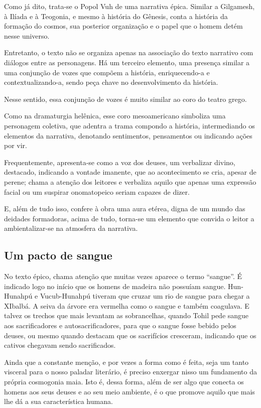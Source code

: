 \documentclass[12pt]{extarticle}
\begin{document}
Como já dito, trata-se o Popol Vuh de uma narrativa épica. Similar a
Gilgamesh, à Ilíada e à Teogonia, e mesmo à história do Gênesis, conta a
história da formação do cosmos, sua posterior organização e o papel que
o homem detém nesse universo.

Entretanto, o texto não se organiza apenas na associação do texto
narrativo com diálogos entre as personagens. Há um terceiro elemento,
uma presença similar a uma conjunção de vozes que compõem a história,
enriquecendo-a e contextualizando-a, sendo peça chave no desenvolvimento
da história.

Nesse sentido, essa conjunção de vozes é muito similar ao coro do teatro
grego.

Como na dramaturgia helênica, esse coro mesoamericano simboliza uma
personagem coletiva, que adentra a trama compondo a história,
intermediando os elementos da narrativa, denotando sentimentos,
pensamentos ou indicando ações por vir.

Frequentemente, apresenta-se como a voz dos deuses, um verbalizar
divino, destacado, indicando a vontade imanente, que ao acontecimento se
cria, apesar de perene; chama a atenção dos leitores e verbaliza aquilo
que apenas uma expressão facial ou um suspirar onomatopeico seriam
capazes de dizer.

E, além de tudo isso, confere à obra uma aura etérea, digna de um mundo
das deidades formadoras, acima de tudo, torna-se um elemento que convida
o leitor a ambientalizar-se na atmosfera da narrativa.

\subsection{Um pacto de sangue}

No texto épico, chama atenção que muitas vezes aparece o termo
``sangue''. É indicado logo no início que os homens de madeira não
possuíam sangue. Hun-Hunahpú e Vucub-Hunahpú tiveram que cruzar um rio
de sangue para chegar a XIbalbá. A seiva da árvore era vermelha como o
sangue e também coagulava. E talvez os trechos que mais levantam as
sobrancelhas, quando Tohil pede sangue aos sacrificadores e
autosacrificadores, para que o sangue fosse bebido pelos deuses, ou
mesmo quando destacam que os sacrifícios cresceram, indicando que os
cativos chegavam sendo sacrificados.

Ainda que a constante menção, e por vezes a forma como é feita, seja um
tanto visceral para o nosso paladar literário, é preciso enxergar nisso
um fundamento da própria cosmogonia maia. Isto é, dessa forma, além de
ser algo que conecta os homens aos seus deuses e ao seu meio ambiente, é
o que promove aquilo que mais lhe dá a sua característica humana.
\end{document}
